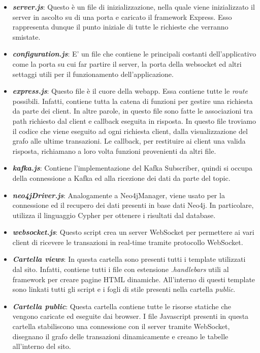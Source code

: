 \begin{itemize}
\item  \textbf{\textit{server.js}}: Questo è un file di inizializzazione, nella quale viene inizializzato il server in ascolto su di una porta e caricato il framework Express. Esso rappresenta dunque il punto iniziale di tutte le richieste che verranno smistate.
\item  \textbf{\textit{configuration.js}}: E' un file che contiene le principali costanti dell'applicativo come la porta su cui far partire il server, la porta della websocket ed altri settaggi utili per il funzionamento dell'applicazione.
\item  \textbf{\textit{express.js}}: Questo file è il cuore della webapp. Essa contiene tutte le \textit{route} possibili. Infatti, contiene tutta la catena di funzioni per gestire una richiesta da parte dei client. In altre parole, in questo file sono fatte le associazioni tra path richiesto dal client e callback eseguita in risposta. In questo file troviamo il codice che viene eseguito ad ogni richiesta client, dalla visualizzazione del grafo alle ultime transazioni. Le callback, per restituire ai client una valida risposta, richiamano a loro volta funzioni provenienti da altri file.
\item  \textbf{\textit{kafka.js}}: Contiene l'implementazione del Kafka Subscriber, quindi si occupa della connessione a Kafka ed alla ricezione dei dati da parte del topic.
\item  \textbf{\textit{neo4jDriver.js}}: Analogamente a Neo4jManager, viene usato per la connessione ed il recupero dei dati presenti in base dati Neo4j. In particolare, utilizza il linguaggio Cypher per ottenere i risultati dal database. 
\item  \textbf{\textit{websocket.js}}: Questo script crea un server WebSocket per permettere ai vari client di ricevere le transazioni in real-time tramite protocollo WebSocket.
\item  \textbf{\textit{Cartella views}}: In questa cartella sono presenti tutti i template utilizzati dal sito. Infatti, contiene tutti i file con estensione \textit{.handlebars} utili al framework per creare pagine HTML dinamiche. All'interno di questi template sono linkati tutti gli script e i fogli di stile presenti nella cartella \textit{public}.
\item  \textbf{\textit{Cartella public}}: Questa cartella contiene tutte le risorse statiche che vengono caricate ed eseguite dai browser. I file Javascript presenti in questa cartella stabiliscono una connessione con il server tramite WebSocket, disegnano il grafo delle transazioni dinamicamente e creano le tabelle all'interno del sito.

\end{itemize}
